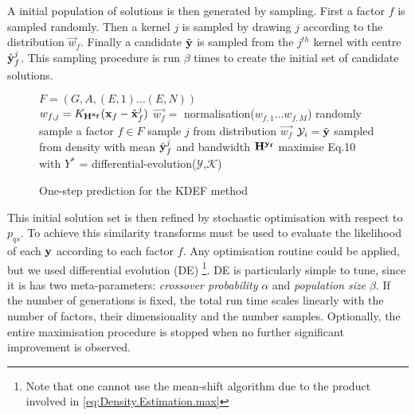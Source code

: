 A initial population of solutions is then generated by sampling. First a factor $f$ is sampled randomly. Then a kernel $j$ is sampled by drawing $j$ according to the distribution $\vec{w}_f$. Finally a candidate $\tilde{\mathbf{y}}$ is sampled from the $j^{th}$ kernel with centre $\hat{\mathbf{y}}^j_f$. This sampling procedure is run $\beta$ times to create the initial set of candidate solutions.
\begin{figure}
\begin{algorithmic}
\STATE $F = (G, A, (E,1) \ldots (E,N))$  \\
\STATE $w_{f,j} = K_{\mathbf{H^{\mathbf{x}_f}}}(\mathbf{x}_f - \hat{\mathbf{x}}_f^j)$
\ENDFOR
\STATE $\vec{w_f} =$ normalisation($w_{f,1} \ldots w_{f,M}$)
\ENDFOR
{}
\STATE randomly sample a factor $f\in F$ 
\STATE sample $j$ from distribution $\vec{w_f}$
\STATE  $\mathcal{Y}_i = \tilde{\mathbf{y}}$ sampled from density with mean $\hat{\mathbf{y}}^j_f$ and bandwidth $\mathbf{H^{\mathbf{y}_f}}$
\ENDFOR
\STATE maximise Eq.10 with $Y^*$ = differential-evolution($\mathcal{Y}$,$\mathcal{K}$) 
\end{algorithmic}
\caption{\label{alg:prediction}One-step prediction for the KDEF method}
\end{figure}

This initial solution set is then refined by stochastic optimisation with respect to $p_{qs}$. To achieve this similarity transforms must be used to evaluate the likelihood of each $\mathbf{y}$ according to each factor $f$. Any optimisation routine could be applied, but we used differential evolution (DE) \cite{storn_differential_1997}\footnote{Note that one cannot use the mean-shift algorithm \cite{cheng_mean_1995}
due to the product involved in \eqref{eq:Density.Estimation.max}}.
DE is particularly simple to tune, since it is has two meta-parameters: \textit{crossover probability} $\alpha$ and \textit{population size} $\beta$. If the number of generations is fixed, the total run time scales linearly with the number of factors, their dimensionality and the number samples. Optionally, the entire maximisation procedure is stopped when no further significant improvement is observed. 

%
%


